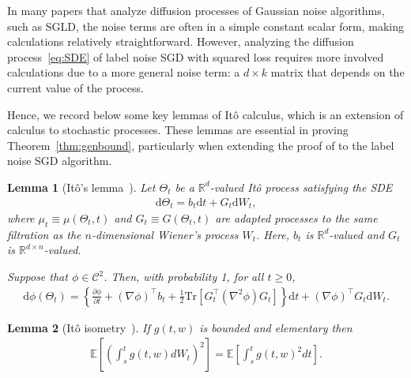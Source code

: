\documentclass{article}
\newtheorem{lemma}{Lemma}
\begin{document}
In many papers that analyze diffusion processes of Gaussian noise algorithms, such as SGLD, the noise terms are often in a simple constant scalar form, making calculations relatively straightforward. However, analyzing the diffusion process~\eqref{eq:SDE} of label noise SGD with  squared loss requires more involved calculations due to a more general noise term: a $d \times k$ matrix that depends on the current value of the process.

Hence, we record below some key lemmas of It\^o calculus, which is an extension of calculus to stochastic processes. These lemmas are essential in proving Theorem~\ref{thm:genbound}, particularly when extending the proof of \citet{Farghly} to the label noise SGD algorithm.

\begin{lemma} [It\^o's lemma~\citep{Ito}]\label{Ito}
	Let $\Theta_t$ be a $\mathbb{R}^d$-valued It\^o process satisfying the SDE
	\begin{align*}
		\mathrm{d}\Theta_t = b_t \mathrm{d}t + G_t \mathrm{d}W_t,
	\end{align*}
	where $\mu_t \equiv \mu (\Theta_t, t)$ and $G_t \equiv G(\Theta_t, t)$ are adapted processes to the same filtration as the $n$-dimensional Wiener's process $W_t$. Here, $b_t$ is $\mathbb{R}^d$-valued and $G_t$ is $\mathbb{R}^{d\times n}$-valued.
	
	Suppose that $\phi \in \mathcal{C}^2$. Then, with probability 1, for all $t\geq 0$,
	\begin{align*}
		\mathrm{d}\phi(\Theta_t) = \left\{\frac{\partial \phi}{\partial t} + (\nabla \phi)^\top b_t + \frac{1}{2} \textrm{Tr} [G_t^\top (\nabla^2 \phi) G_t] \right\} \mathrm{d}t + (\nabla \phi)^\top G_t \mathrm{d}W_t.
	\end{align*}
\end{lemma}

\begin{lemma}[It\^o isometry~\citep{Oksendal}]
	If $g(t, w)$ is bounded and elementary then
	\begin{align*}
		\mathbb{E}\left[\left(\int_s^t g(t, w) dW_t\right)^2\right] = \mathbb{E} \left[\int_s^t g(t, w)^2 dt\right].
	\end{align*}
\end{lemma}
\end{document}
